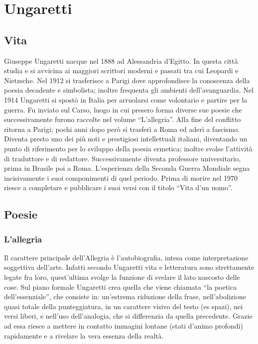 \documentclass[12pt]{report}
\begin{document}
		\onecolumn
		\section{Ungaretti}
		\subsection{Vita}
		
		Giuseppe Ungaretti nacque nel 1888 ad Alessandria d’Egitto. 
		In questa città studia e si avvicina ai maggiori scrittori moderni e passati tra cui Leopardi e Nietzsche. 
		Nel 1912 si trasferisce a Parigi dove approfondisce la conoscenza della poesia decadente e simbolista; inoltre frequenta gli ambienti dell’avanguardia. 
		Nel 1914 Ungaretti si spostò in Italia per arruolarsi come volontario e partire per la guerra. Fu inviato sul Carso, luogo in cui presero forma diverse sue poesie che successivamente furono raccolte nel volume “L’allegria”. 
		Alla fine del conflitto ritorna a Parigi; pochi anni dopo però si trasferì a Roma ed aderì a fascismo.
		Diventa presto uno dei più noti e prestigiosi intellettuali italiani, diventando un punto di riferimento per lo sviluppo della poesia ermetica; inoltre svolse l’attività di traduttore e di redattore.
		Successivamente diventa professore universitario, prima in Brasile poi a Roma. L’esperienza della Seconda Guerra Mondiale segna incisivamente i suoi componimenti di quel periodo. Prima di morire nel 1970 riesce a completare e pubblicare i suoi versi con il titolo “Vita d’un uomo”.
		
		
		\subsection{Poesie}
		
		\subsubsection{L'allegria}

		Il carattere principale dell’Allegria è l’autobiografia, intesa come interpretazione soggettiva dell’arte. 
		Infatti secondo Ungaretti vita e letteratura sono strettamente legate fra loro, quest’ultima svolge la funzione di svelare il lato nascosto delle cose. 
		Sul piano formale Ungaretti crea quella che viene chiamata “la poetica dell’essenziale”, che consiste in: un’estrema riduzione della frase, nell’abolizione quasi totale della punteggiatura, in un carattere visivo del testo (es spazi), nei versi liberi, e nell’uso dell’analogia, che si differenzia da quella precedente. 
		Grazie ad essa riesce a mettere in contatto immagini lontane (stati d’animo profondi) rapidamente e a rivelare la vera essenza della realtà.
		
\end{document}
